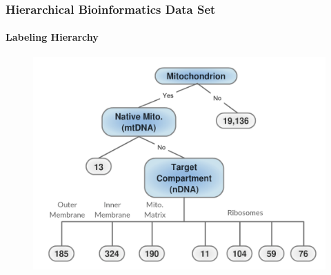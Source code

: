 \documentclass{beamer}
\begin{document}
\begin{frame}
\begin{table}[H]
{\begin{tabular}{|c|c|c|}
      \end{tabular} }
    \end{table}
\end{frame}
\begin{frame}
    \frametitle{Hierarchical Bioinformatics Data Set}  %
    \framesubtitle{Labeling Hierarchy}
    \begin{figure}[!htb]
        \centering
    \includegraphics[width=0.75\columnwidth]{fig/MitoTreeLabels}
        \label{fig:Mitotree}
    \end{figure}
\end{frame}
\end{document}

